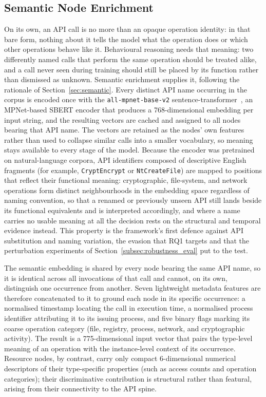 \documentclass[%
    BCOR=10mm,
    DIV=13,
    toc=bibliography,
    toc=listof,
    oneside,
    12pt,
]{scrbook}
\begin{document}
\subsection{Semantic Node Enrichment}
\label{subsec:semantic_enrichment}

On its own, an API call is no more than an opaque operation identity: in that
bare form, nothing about it tells the model what the operation does or which
other operations behave like it. Behavioural reasoning needs that meaning:
two differently named calls that perform the same operation should be treated
alike, and a call never seen during training should still be placed by its
function rather than dismissed as unknown. Semantic enrichment supplies it,
following the rationale of Section~\ref{sec:semantic}. Every distinct API name
occurring in the corpus is encoded once with the \texttt{all-mpnet-base-v2}
sentence-transformer~\cite{reimers2019sbert, mpnet2020}, an MPNet-based SBERT
encoder that produces a 768-dimensional embedding per input string, and the
resulting vectors are cached and assigned to all nodes bearing that API name.
The vectors are retained as the nodes' own features rather than used to collapse
similar calls into a smaller vocabulary, so meaning stays available to every
stage of the model. Because the encoder was pretrained on natural-language
corpora, API
identifiers composed of descriptive English fragments (for example,
\texttt{CryptEncrypt} or \texttt{NtCreateFile}) are mapped to positions that
reflect their functional meaning: cryptographic, file-system, and network
operations form distinct neighbourhoods in the embedding space regardless of
naming convention, so that a renamed or previously unseen API still lands
beside its functional equivalents and is interpreted accordingly, and where a
name carries no usable meaning at all the decision rests on the structural and
temporal evidence instead. This property is the framework's first defence against API
substitution and naming variation, the evasion that RQ1 targets and that the
perturbation experiments of Section~\ref{subsec:robustness_eval} put to the
test.

The semantic embedding is shared by every node bearing the same API name, so it
is identical across all invocations of that call and cannot, on its own,
distinguish one occurrence from another. Seven lightweight metadata features are
therefore concatenated to it to ground each node in its specific occurrence: a
normalised timestamp locating the call in execution time, a normalised process
identifier attributing it to its issuing process, and five binary flags marking
its coarse operation category (file, registry, process, network, and
cryptographic activity). The result is a 775-dimensional input vector that pairs
the type-level meaning of an operation with the instance-level context of its
occurrence. Resource nodes, by contrast, carry only compact 6-dimensional
numerical descriptors of their type-specific properties (such as access counts
and operation categories); their discriminative contribution is structural
rather than featural, arising from their connectivity to the API spine.
\end{document}
